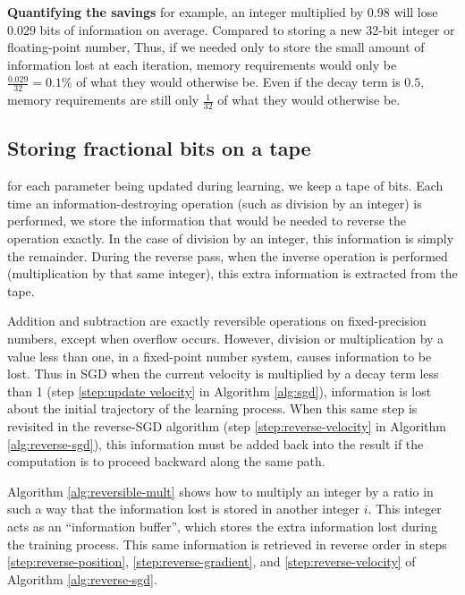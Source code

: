 \documentclass{article}
\begin{document}
\textbf{Quantifying the savings}
for example, an integer multiplied by 0.98 will lose $0.029$ bits of information on average.
Compared to storing a new 32-bit integer or floating-point number, 
Thus, if we needed only to store the small amount of information lost at each iteration, memory requirements would only be ${\frac{0.029}{32} = 0.1\%}$ of what they would otherwise be.
Even if the decay term is $0.5$, memory requirements are still only $\frac{1}{32}$ of what they would otherwise be.

\subsection{Storing fractional bits on a tape}

for each parameter being updated during learning, we keep a tape of bits.
Each time an information-destroying operation (such as division by an integer) is performed, we store the information that would be needed to reverse the operation exactly.  In the case of division by an integer, this information is simply the remainder.
During the reverse pass, when the inverse operation is performed (multiplication by that same integer), this extra information is extracted from the tape.

Addition and subtraction are exactly reversible operations on fixed-precision numbers, except when overflow occurs.
However, division or multiplication by a value less than one, in a fixed-point number system, causes information to be lost.
Thus in SGD when the current velocity is multiplied by a decay term less than 1 (step \ref{step:update velocity} in Algorithm \ref{alg:sgd}), information is lost about the initial trajectory of the learning process.
When this same step is revisited in the reverse-SGD algorithm (step \ref{step:reverse-velocity} in Algorithm \ref{alg:reverse-sgd}), this information must be added back into the result if the computation is to proceed backward along the same path.

Algorithm \ref{alg:reversible-mult} shows how to multiply an integer by a ratio in such a way that the information lost is stored in another integer $i$.
This integer acts as an ``information buffer'', which stores the extra information lost during the training process.
This same information is retrieved in reverse order in steps \ref{step:reverse-position}, \ref{step:reverse-gradient}, and \ref{step:reverse-velocity} of Algorithm \ref{alg:reverse-sgd}.
\end{document}
